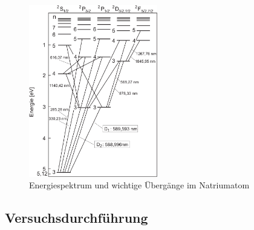 \begin{figure}[H]
  \centering
  \includegraphics[width=0.5\textwidth]{files/uebergaenge.png}
  \caption{Energiespektrum und wichtige Übergänge im Natriumatom}
  \label{fig:uebergaenge}
\end{figure}

\newpage

\subsection{Versuchsdurchführung}